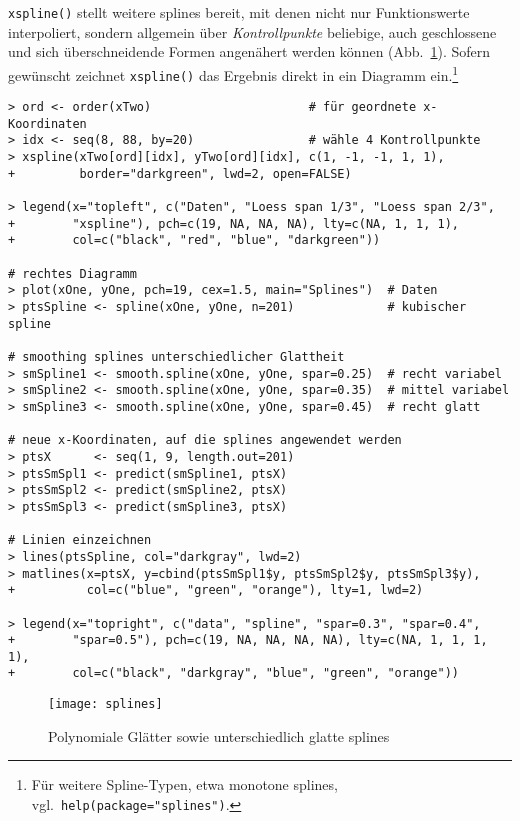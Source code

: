 \lstinline!xspline()! stellt weitere splines bereit, mit denen nicht nur Funktionswerte interpoliert, sondern allgemein über \emph{Kontrollpunkte} beliebige, auch geschlossene und sich überschneidende Formen angenähert werden können (Abb.\ \ref{fig:splines}). Sofern gewünscht zeichnet \lstinline!xspline()! das Ergebnis direkt in ein Diagramm ein.\footnote{Für weitere Spline-Typen, etwa monotone splines, vgl.\ \lstinline!help(package="splines")!.}
\begin{lstlisting}
> ord <- order(xTwo)                      # für geordnete x-Koordinaten
> idx <- seq(8, 88, by=20)                # wähle 4 Kontrollpunkte
> xspline(xTwo[ord][idx], yTwo[ord][idx], c(1, -1, -1, 1, 1),
+         border="darkgreen", lwd=2, open=FALSE)

> legend(x="topleft", c("Daten", "Loess span 1/3", "Loess span 2/3",
+        "xspline"), pch=c(19, NA, NA, NA), lty=c(NA, 1, 1, 1),
+        col=c("black", "red", "blue", "darkgreen"))

# rechtes Diagramm
> plot(xOne, yOne, pch=19, cex=1.5, main="Splines")  # Daten
> ptsSpline <- spline(xOne, yOne, n=201)             # kubischer spline

# smoothing splines unterschiedlicher Glattheit
> smSpline1 <- smooth.spline(xOne, yOne, spar=0.25)  # recht variabel
> smSpline2 <- smooth.spline(xOne, yOne, spar=0.35)  # mittel variabel
> smSpline3 <- smooth.spline(xOne, yOne, spar=0.45)  # recht glatt

# neue x-Koordinaten, auf die splines angewendet werden
> ptsX      <- seq(1, 9, length.out=201)
> ptsSmSpl1 <- predict(smSpline1, ptsX)
> ptsSmSpl2 <- predict(smSpline2, ptsX)
> ptsSmSpl3 <- predict(smSpline3, ptsX)

# Linien einzeichnen
> lines(ptsSpline, col="darkgray", lwd=2)
> matlines(x=ptsX, y=cbind(ptsSmSpl1$y, ptsSmSpl2$y, ptsSmSpl3$y),
+          col=c("blue", "green", "orange"), lty=1, lwd=2)

> legend(x="topright", c("data", "spline", "spar=0.3", "spar=0.4",
+        "spar=0.5"), pch=c(19, NA, NA, NA, NA), lty=c(NA, 1, 1, 1, 1),
+        col=c("black", "darkgray", "blue", "green", "orange"))
\end{lstlisting}

\begin{figure}[ht]
\centering
\texttt{[image: splines]}
\vspace*{-1.5em}
\caption{Polynomiale Glätter sowie unterschiedlich glatte splines}
\label{fig:splines}
\end{figure}

